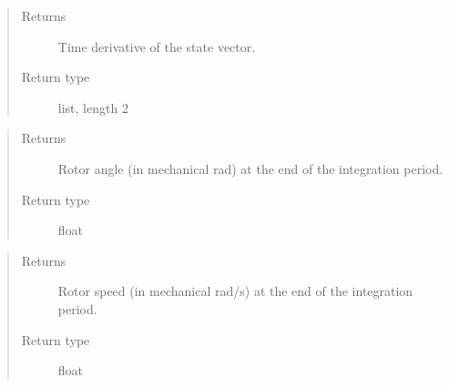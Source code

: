 \documentclass[letterpaper,10pt,english]{sphinxmanual}
\begin{document}
\begin{fulllineitems}
\begin{fulllineitems}
\begin{quote}
\begin{description}
\begin{itemize}
\end{itemize}

\item[{Returns}] \leavevmode
\sphinxAtStartPar
Time derivative of the state vector.

\item[{Return type}] \leavevmode
\sphinxAtStartPar
list, length 2

\end{description}\end{quote}

\end{fulllineitems}


\begin{fulllineitems}
\label{\detokenize{model:model.mech.Mechanics.meas_position}}
\pysigstartsignatures
{}
\pysigstopsignatures\begin{quote}\begin{description}
\item[{Returns}] \leavevmode
\sphinxAtStartPar
{} \textendash{} Rotor angle (in mechanical rad) at the end of the integration
period.

\item[{Return type}] \leavevmode
\sphinxAtStartPar
float

\end{description}\end{quote}

\end{fulllineitems}


\begin{fulllineitems}
\label{\detokenize{model:model.mech.Mechanics.meas_speed}}
\pysigstartsignatures
{}
\pysigstopsignatures\begin{quote}\begin{description}
\item[{Returns}] \leavevmode
\sphinxAtStartPar
{} \textendash{} Rotor speed (in mechanical rad/s) at the end of the integration
period.

\item[{Return type}] \leavevmode
\sphinxAtStartPar
float

\end{description}\end{quote}

\end{fulllineitems}


\end{fulllineitems}
\end{document}
